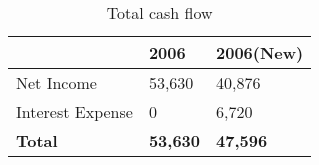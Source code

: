 \begin{table}[ht]
\centering
\begin{tabular}{@{}lll@{}}
\toprule
                 & 2006            & 2006(New)       \\ \midrule
Net Income       & 53,630          & 40,876          \\
Interest Expense & 0               & 6,720           \\
\textbf{Total}   & \textbf{53,630} & \textbf{47,596} \\ \bottomrule
\end{tabular}
\caption{Total cash flow}
\label{tab:q4-totalcf}
\end{table}
